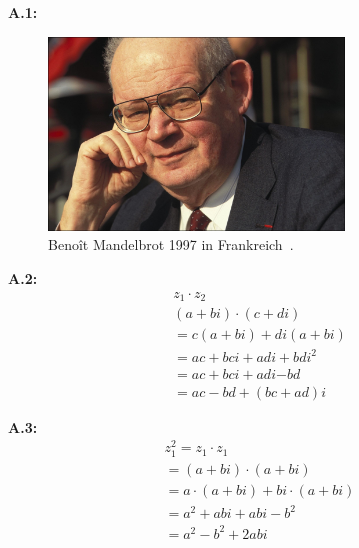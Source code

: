 \pagestyle{appendix}
\newcommand{\figuretag}[1]{%
  \addtocounter{figure}{-1}%
  \renewcommand{\thefigure}{#1}%
}

\noindent\textbf{A.1:}\label{app:1}
\begin{figure}[H]\figuretag{A.1}
\centering
\includegraphics[width=0.7\textwidth]{images/benoit-mandelbrot}
\caption{Benoît Mandelbrot 1997 in Frankreich~\cite{gaillarde_benoit_1997}.}
\label{fig:benoit-mandelbrot-picture}
\end{figure}

\noindent\textbf{A.2:}\label{app:2}
\begin{equation}\tag{A.2}\label{eq:complex-numbers-multiplication}
  \begin{split}
    z_1 \cdot z_2 \\
    (a + bi) \cdot (c + di) \\
    =  c(a + bi) + di(a + bi) \\
    = ac + bci + adi + bdi^2 \\
    = ac + bci + adi \boldsymbol{ - } bd \\
    = ac - bd +(bc + ad)i
  \end{split}
\end{equation}

\noindent\textbf{A.3:}\label{app:3}
\begin{equation}\tag{A.3}\label{eq:complex-numbes-squaring}
  \begin{split}
    z_1^2
    = z_1 \cdot z_1 \\
    = (a + bi) \cdot (a + bi) \\
    = a \cdot (a + bi) + bi \cdot (a + bi) \\
    = a^2 + abi + abi - b^2 \\
    = a^2 - b^2 + 2abi
  \end{split}
\end{equation}


